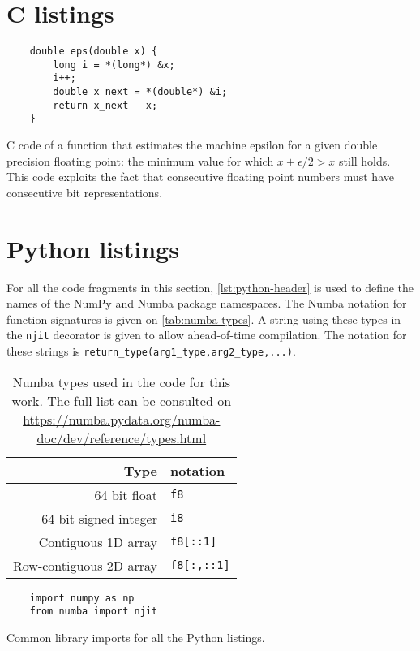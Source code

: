 \section{C listings}


\begin{listing}[H]
	\begin{verbatim}
	double eps(double x) {
	    long i = *(long*) &x;
	    i++;
	    double x_next = *(double*) &i;
	    return x_next - x;
	}
	\end{verbatim}
	\caption[\texttt{eps} C function]{
		C code of a function that estimates the machine epsilon for a given double precision floating point: 
		the minimum value for which $x+\epsilon/2 > x$ still holds.
		This code exploits the fact that consecutive floating point numbers must have consecutive bit representations.
	}
	\label{lst:c-eps}
\end{listing}



\section{Python listings}

For all the code fragments in this section, \autoref{lst:python-header} 
is used to define the names of the NumPy and Numba package namespaces.
The Numba notation for function signatures is given on \autoref{tab:numba-types}.
A string using these types in the \texttt{njit} decorator is given to allow ahead-of-time compilation.
The notation for these strings is \texttt{return\_type(arg1\_type,arg2\_type,...)}.

\begin{table}
	\centering
	\begin{tabular}{r|l}
		Type & notation \\\hline\hline
		64 bit float & \texttt{f8} \\
		64 bit signed integer & \texttt{i8} \\
		Contiguous 1D array & \texttt{f8[::1]} \\
		Row-contiguous 2D array & \texttt{f8[:,::1]} 
	\end{tabular}
	\caption[Numba type aliases]{
		Numba types used in the code for this work. 
		The full list can be consulted on \url{https://numba.pydata.org/numba-doc/dev/reference/types.html}
	}
	\label{tab:numba-types}
\end{table}

\begin{listing}
	\begin{verbatim}
	import numpy as np
	from numba import njit
	\end{verbatim}
	\caption[Library aliases for Python]{Common library imports for all the Python listings.}
	\label{lst:python-header}
\end{listing}



